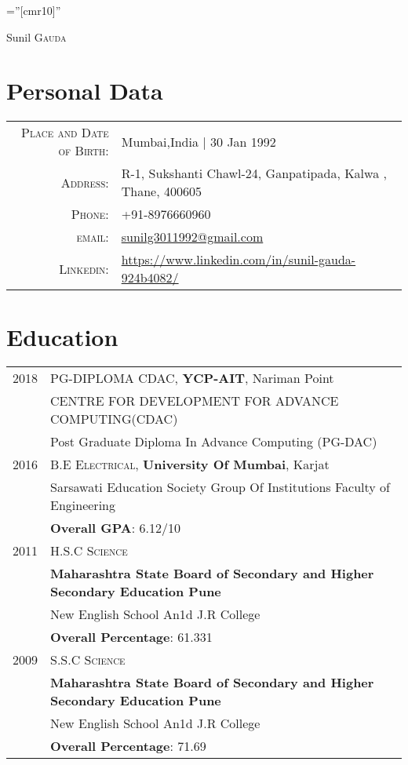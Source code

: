 \pagestyle{empty} %

\font\fb=''[cmr10]'' %

\par{\centering
		{\Huge Sunil \textsc{Gauda}
	}\bigskip\par}

\section{Personal Data}

\begin{tabular}{rl}
    \textsc{Place and Date of Birth:} & Mumbai,India  | 30 Jan 1992 \\
    \textsc{Address:}   & R-1, Sukshanti Chawl-24, Ganpatipada,  Kalwa , Thane, 400605 \\
    \textsc{Phone:}     & +91-8976660960 \\
    \textsc{email:}     & \href{mailto:sunilg3011992@gmail.com}{sunilg3011992@gmail.com}\\
    \textsc{Linkedin:}     &
    \url{https://www.linkedin.com/in/sunil-gauda-924b4082/}
\end{tabular}

\section{Education}
\begin{tabular}{rl}	
 2018 & PG-DIPLOMA \textsc{CDAC}, \textbf{YCP-AIT}, Nariman Point\\
& CENTRE FOR DEVELOPMENT FOR ADVANCE COMPUTING(CDAC)\\
&Post Graduate Diploma In Advance Computing (PG-DAC)\\

 2016 & B.E \textsc{Electrical}, \textbf{University Of Mumbai}, Karjat\\
& Sarsawati Education Society Group Of Institutions Faculty of Engineering\\
&\normalsize \textbf{Overall GPA}: 6.12/10\\

 2011&  H.S.C \textsc{Science} \\&\textbf{Maharashtra State Board of Secondary and Higher Secondary Education Pune}\\
&New English School An1d J.R College\\
&\normalsize {\textbf{Overall Percentage}}: 61.331\\

2009&  S.S.C \textsc{Science} \\&\textbf{Maharashtra State Board of Secondary and Higher Secondary Education Pune}\\
&New English School An1d J.R College\\
&\normalsize {\textbf{Overall Percentage}}: 71.69\\
\end{tabular}

